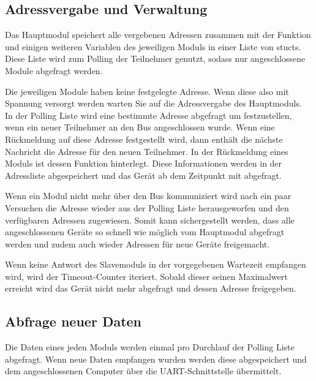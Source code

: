 \subsection{Adressvergabe und Verwaltung}
\textmd{Das Hauptmodul speichert alle vergebenen Adressen zusammen mit der Funktion und einigen weiteren Variablen des jeweiligen Moduls in einer Liste von stucts.\\
Diese Liste wird zum Polling der Teilnehmer genutzt, sodass nur angeschlossene Module abgefragt werden.\\}





\textmd{Die jeweiligen Module haben keine festgelegte Adresse. Wenn diese also mit Spannung versorgt werden warten Sie auf die Adressvergabe des Hauptmoduls.\\
In der Polling Liste wird eine bestimmte Adresse abgefragt um festzustellen, wenn ein neuer Teilnehmer an den Bus angeschlossen wurde. Wenn eine Rückmeldung auf diese Adresse festgestellt wird, dann enthält die nächste Nachricht die Adresse für den neuen Teilnehmer.
In der Rückmeldung eines Moduls ist dessen Funktion hinterlegt. Diese Informationen werden in der Adressliste abgespeichert und das Gerät ab dem Zeitpunkt mit abgefragt.\\
}


\textmd{Wenn ein Modul nicht mehr über den Bus kommuniziert wird nach ein paar Versuchen die Adresse wieder aus der Polling Liste herausgeworfen und den verfügbaren Adressen zugewiesen. Somit kann sichergestellt werden, dass alle angeschlossenen Geräte so schnell wie möglich vom Hauptmodul abgefragt werden und zudem auch wieder Adressen für neue Geräte freigemacht.
}



\textmd{Wenn keine Antwort des Slavemoduls in der vorgegebenen Wartezeit empfangen wird, wird der Timeout-Counter iteriert. Sobald dieser seinen Maximalwert erreicht wird das Gerät nicht mehr abgefragt und dessen Adresse freigegeben.
}


\subsection{Abfrage neuer Daten}
\textmd{Die Daten eines jeden Moduls werden einmal pro Durchlauf der Polling Liste abgefragt. Wenn neue Daten empfangen wurden werden diese abgespeichert und dem angeschlossenen Computer über die UART-Schnittstelle übermittelt.
}

